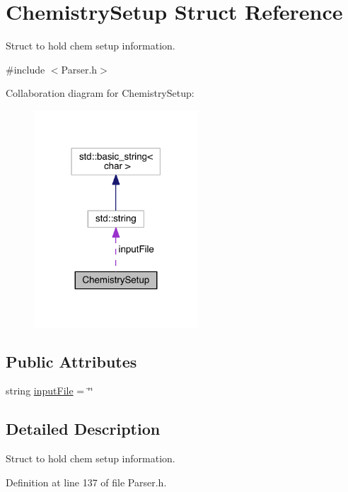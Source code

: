 \hypertarget{structChemistrySetup}{\section{Chemistry\+Setup Struct Reference}
\label{structChemistrySetup}
}


Struct to hold chem setup information.  




{\ttfamily \#include $<$Parser.\+h$>$}



Collaboration diagram for Chemistry\+Setup\+:\nopagebreak
\begin{figure}[H]
\begin{center}
\leavevmode
\includegraphics[width=174pt]{structChemistrySetup__coll__graph}
\end{center}
\end{figure}
\subsection*{Public Attributes}
\begin{DoxyCompactItemize}
\item 
string \hyperlink{structChemistrySetup_a662524c2c7d29c8b83a6016559d256e5}{input\+File} = \char`\"{}\char`\"{}
\end{DoxyCompactItemize}


\subsection{Detailed Description}
Struct to hold chem setup information. 

Definition at line 137 of file Parser.\+h.



